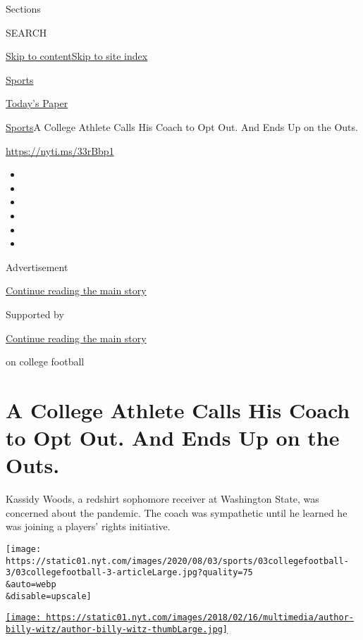 Sections

SEARCH

\protect\hyperlink{site-content}{Skip to
content}\protect\hyperlink{site-index}{Skip to site index}

\href{https://www.nytimes.com/section/sports}{Sports}

\href{https://myaccount.nytimes.com/auth/login?response_type=cookie\&client_id=vi}{}

\href{https://www.nytimes.com/section/todayspaper}{Today's Paper}

\href{/section/sports}{Sports}\textbar{}A College Athlete Calls His
Coach to Opt Out. And Ends Up on the Outs.

\url{https://nyti.ms/33rBbp1}

\begin{itemize}
\item
\item
\item
\item
\item
\item
\end{itemize}

Advertisement

\protect\hyperlink{after-top}{Continue reading the main story}

Supported by

\protect\hyperlink{after-sponsor}{Continue reading the main story}

on college football

\hypertarget{a-college-athlete-calls-his-coach-to-opt-out-and-ends-up-on-the-outs}{%
\section{A College Athlete Calls His Coach to Opt Out. And Ends Up on
the
Outs.}\label{a-college-athlete-calls-his-coach-to-opt-out-and-ends-up-on-the-outs}}

Kassidy Woods, a redshirt sophomore receiver at Washington State, was
concerned about the pandemic. The coach was sympathetic until he learned
he was joining a players' rights initiative.

\texttt{[image: https://static01.nyt.com/images/2020/08/03/sports/03collegefootball-3/03collegefootball-3-articleLarge.jpg?quality=75\\\&auto=webp\\\&disable=upscale]}

\href{https://www.nytimes.com/by/billy-witz}{\texttt{[image: https://static01.nyt.com/images/2018/02/16/multimedia/author-billy-witz/author-billy-witz-thumbLarge.jpg]}}

